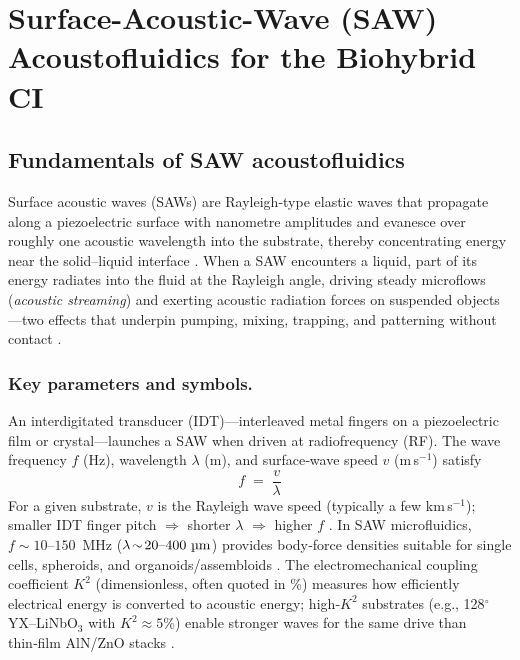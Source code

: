 \documentclass[referee,pdflatex, sn-vancouver-num]{sn-jnl}%
\theoremstyle{thmstyleone}%
\theoremstyle{thmstyletwo}%
\theoremstyle{thmstylethree}%
\begin{document}
\section{Surface-Acoustic-Wave (SAW) Acoustofluidics for the Biohybrid CI}\label{sec:saw}
\subsection{Fundamentals of SAW acoustofluidics}
Surface acoustic waves (SAWs) are Rayleigh‑type elastic waves that propagate along a piezoelectric surface with nanometre amplitudes and evanesce over roughly one acoustic wavelength into the substrate, thereby concentrating energy near the solid–liquid interface \cite{Friend2011,Yeo2014_SAWmicrofluidics}. When a SAW encounters a liquid, part of its energy radiates into the fluid at the Rayleigh angle, driving steady microflows (\emph{acoustic streaming}) and exerting acoustic radiation forces on suspended objects—two effects that underpin pumping, mixing, trapping, and patterning without contact \cite{Ding2013,Gedge2012_SAW, Friend2011,Yeo2014_SAWmicrofluidics}.

\subsubsection{Key parameters and symbols.}
An interdigitated transducer (IDT)—interleaved metal fingers on a piezoelectric film or crystal—launches a SAW when driven at radiofrequency (RF). The wave frequency \(f\) (Hz), wavelength \(\lambda\) (m), and surface‑wave speed \(v\) (m\,s\(^{-1}\)) satisfy
\[
f \;=\; \frac{v}{\lambda}
\]
For a given substrate, \(v\) is the Rayleigh wave speed (typically a few km\,s\(^{-1}\)); smaller IDT finger pitch \(\Rightarrow\) shorter \(\lambda\) \(\Rightarrow\) higher \(f\) \cite{Friend2011,Yeo2014_SAWmicrofluidics, Bruus2015_Governing_Equations}. In SAW microfluidics, \(f\!\sim\!10\text{–}150\)~MHz (\(\lambda\!\sim\!20\text{–}400~\text{\textmu m}\)) provides body‑force densities suitable for single cells, spheroids, and organoids/assembloids \cite{Shilton2008_NanoDisp,Gedge2012_SAW}. The electromechanical coupling coefficient \(K^2\) (dimensionless, often quoted in \%) measures how efficiently electrical energy is converted to acoustic energy; high‑\(K^2\) substrates (e.g., 128$^{\circ}$ YX–LiNbO\(_3\) with \(K^2\!\approx\!5\%\)) enable stronger waves for the same drive than thin‑film AlN/ZnO stacks \cite{Campbell1998,Yeo2014_SAWmicrofluidics}.
\end{document}
